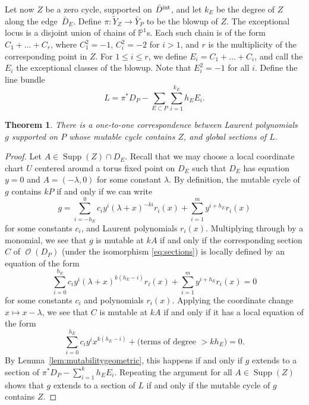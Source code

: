 \documentclass[pdftex]{sigma}
\numberwithin{equation}{section}
\newtheorem{Theorem}{Theorem}[section]
\DeclareMathOperator{\Supp}{{Supp}}
\DeclareMathOperator{\cO}{\mathcal{O}}
\newcommand{\PP}{\mathbb{P}}
\begin{document}
Let now $Z$ be a zero cycle, supported on $\bar{D}^{\rm int}$, and let $k_E$ be the degree of $Z$ along the edge~$\bar{D}_E$.
Define $\pi \colon \tilde{Y}_Z \rightarrow \bar{Y}_P$ to be the blowup of $Z$. The exceptional locus is a disjoint union of chains of $\PP^1$s. Each such chain is of the form $C_1+\dots +C_r$, where $C_1^2=-1$, $C_i^2=-2$ for $i>1$, and $r$ is the multiplicity of the corresponding point in $Z$. For $1 \leq i \leq r$, we define $E_i=C_1+\dots+C_i$, and call the $E_i$ the exceptional classes of the blowup. Note that $E_i^2=-1$ for all $i$. Define the line bundle
\[
L=\pi^*D_P-\sum_{E\subset P} \sum_{i=1}^{k_E} h_EE_i.
\]
	\begin{Theorem}\label{thm:MMLPassections}
There is a one-to-one correspondence between Laurent polynomials $g$ supported on $P$ whose mutable cycle contains $Z$, and global sections of $L$.
\end{Theorem}
\begin{proof}
	Let $A \in \Supp(Z) \cap D_E$. Recall that we may choose a local coordinate chart $U$ centered around a torus fixed point on $D_E$ such that $D_E$ has equation $y=0$ and $A=(-\lambda, 0)$ for some constant $\lambda$. By definition, the mutable cycle of $g$ contains $kP$ if and only if we can write
	\[
	g=	
	\sum_{i=-h_E}^{0}c_i{y^{i}}(\lambda+x)^{-ki}{r}_{i}(x)+\sum_{i=1}^m {y^{i+h_E}}{r}_i(x)
	\]
	for some constants $c_i$, and Laurent polynomials $r_i(x)$.
	Multiplying through by a monomial, we see that $g$ is mutable at $kA$ if and only if the corresponding section $C$ of $\cO(D_P)$ (under the isomorphism \eqref{eq:sections}) is locally defined by an equation of the form
	\[	
	\sum_{i=0}^{h_E}c_i{y^{i}}(\lambda+x)^{k(h_E-i)}{r}_{i}(x)+\sum_{i=1}^m {y^{i+h_E}}{r}_i(x)=0
	\]
	for some constants $c_i$ and polynomials $r_i(x)$.
	Applying the coordinate change $x \mapsto x-\lambda$, we see that $C$ is mutable at $kA$ if and only if it has a local equation of the form
	\[	
	\sum_{i=0}^{h_E}c_i{y^{i}}x^{k(h_E-i)}+\text{(terms of degree $>kh_E$)}=0.
	\]
	By Lemma~\ref{lem:mutabilitygeometric}, this happens if and only if $g$ extends to a section of $\pi^*D_P-\sum_{i=1}^k h_E E_i$. Repeating the argument for all $A \in \Supp(Z)$ shows that $g$ extends to a section of $L$ if and only if the mutable cycle of $g$ contains $Z$.
	\end{proof}
\end{document}
